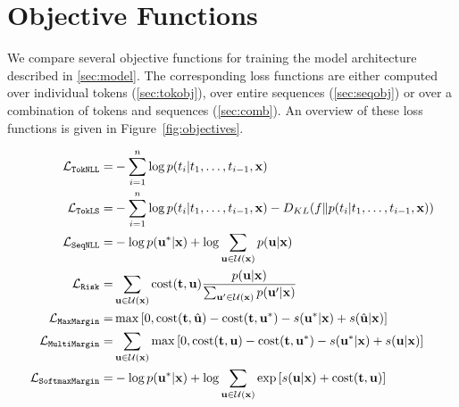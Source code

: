 \documentclass[11pt,a4paper]{article}
\newcommand{\source}{\mathbf{x}}
\newcommand{\pseudoreference}{\mathbf{u}^*}
\newcommand{\goldreference}{\mathbf{t}}
\newcommand{\goldreferencetok}{t}
\newcommand{\candhypos}{\mathcal{U}}
\newcommand{\candhypo}{\mathbf{u}}
\newcommand{\TokNLL}{\texttt{TokNLL}}
\newcommand{\TokLS}{\texttt{TokLS}}
\newcommand{\SeqNLL}{\texttt{SeqNLL}}
\newcommand{\Risk}{\texttt{Risk}}
\newcommand{\MaxMargin}{\texttt{MaxMargin}}
\newcommand{\MultiMargin}{\texttt{MultiMargin}}
\newcommand{\SoftmaxMargin}{\texttt{SoftmaxMargin}}
\begin{document}
\section{Objective Functions}
\label{sec:objectives}

We compare several objective functions for training the model architecture described in \textsection\ref{sec:model}. The corresponding loss functions are either computed over individual tokens (\textsection\ref{sec:tokobj}), over entire sequences (\textsection\ref{sec:seqobj}) or over a combination of tokens and sequences (\textsection\ref{sec:comb}). An overview of these loss functions is given in Figure~\ref{fig:objectives}.


\begin{figure*}
\begin{align}
\label{eq:toknll}
\mathcal{L}_{\TokNLL} = &
-\sum_{i=1}^n \log p(\goldreferencetok_i | \goldreferencetok_1, \dots, \goldreferencetok_{i-1}, \source) \\
\label{eq:tokls}
\mathcal{L}_{\TokLS} = &
-\sum_{i=1}^n \log p(\goldreferencetok_i | \goldreferencetok_1, \dots, \goldreferencetok_{i-1}, \source) - D_{KL}(f\Arrowvert p(\goldreferencetok_i | \goldreferencetok_1, \dots, \goldreferencetok_{i-1}, \source))\\
\label{eq:seqnll}
\mathcal{L}_{\SeqNLL} = &
-\log p(\pseudoreference|\source) + \log \sum_{\candhypo \in \candhypos(\source)} p(\candhypo|\source) \\
\label{eq:risk}
\mathcal{L}_{\Risk} = &
\sum_{\candhypo \in \candhypos(\source)} \operatorname{cost}(\goldreference, \candhypo) \frac{p(\candhypo|\source)}{\sum_{\candhypo' \in \candhypos(\source)} p(\candhypo'|\source)} \\
\label{eq:maxmargin}
\mathcal{L}_{\MaxMargin} = &
\max \left[0, \operatorname{cost}(\goldreference, \hat{\candhypo}) - \operatorname{cost}(\goldreference, \pseudoreference) - s(\pseudoreference | \source) + s(\hat{\candhypo} | \source) \right] \\
\label{eq:multimargin}
\mathcal{L}_{\MultiMargin} = &
\sum_{\candhypo \in \candhypos(\source)}\max \left[0, \operatorname{cost}(\goldreference, \candhypo) - \operatorname{cost}(\goldreference, \pseudoreference) - s(\pseudoreference | \source) + s(\candhypo | \source) \right] \\
\label{eq:smm}
\mathcal{L}_{\SoftmaxMargin} = &
-\log p(\pseudoreference | \source) + \log\sum_{\candhypo \in \candhypos(\source)} \exp\left[ s(\candhypo|\source) + \operatorname{cost}(\goldreference, \candhypo) \right]
\end{align}
\caption{Token and sequence negative log-likelihood (Equations~\ref{eq:toknll} and~\ref{eq:seqnll}), token-level label smoothing (Equation~\ref{eq:tokls}), expected risk (Equation~\ref{eq:risk}), max-margin (Equation~\ref{eq:maxmargin}), multi-margin (Equation~\ref{eq:multimargin}), softmax-margin (Equation~\ref{eq:smm}).
We denote the source as $\source$, the reference target as $\goldreference$, the set of candidate outputs as $\candhypos$ and the best candidate (pseudo reference) as $\pseudoreference$.
For max-margin we denote the candidate with the highest model score as $\hat{\candhypo}$.
\label{fig:objectives}}
\end{figure*}
\end{document}
